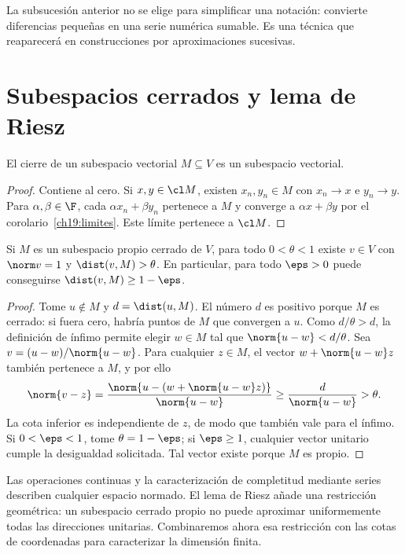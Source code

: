 La subsucesión anterior no se elige para simplificar una notación: convierte diferencias pequeñas en una serie numérica sumable. Es una técnica que reaparecerá en construcciones por aproximaciones sucesivas.

\section{Subespacios cerrados y lema de Riesz}

\begin{proposicion}\label{ch19:cierre-subespacio}
El cierre de un subespacio vectorial $M\subseteq V$ es un subespacio vectorial.
\end{proposicion}
\begin{proof}
Contiene al cero. Si $x,y\in\cl M$, existen $x_n,y_n\in M$ con $x_n\to x$ e $y_n\to y$. Para $\alpha,\beta\in\F$, cada $\alpha x_n+\beta y_n$ pertenece a $M$ y converge a $\alpha x+\beta y$ por el corolario~\ref{ch19:limites}. Este límite pertenece a $\cl M$.
\end{proof}

\begin{lema}[Riesz]\label{ch19:riesz}
Si $M$ es un subespacio propio cerrado de $V$, para todo $0<\theta<1$ existe $v\in V$ con $\norm v=1$ y $\dist(v,M)>\theta$. En particular, para todo $\eps>0$ puede conseguirse $\dist(v,M)\geq1-\eps$.
\end{lema}
\begin{proof}
Tome $u\notin M$ y $d=\dist(u,M)$. El número $d$ es positivo porque $M$ es cerrado: si fuera cero, habría puntos de $M$ que convergen a $u$. Como $d/\theta>d$, la definición de ínfimo permite elegir $w\in M$ tal que $\norm{u-w}<d/\theta$. Sea $v=(u-w)/\norm{u-w}$. Para cualquier $z\in M$, el vector $w+\norm{u-w}z$ también pertenece a $M$, y por ello
\[
 \norm{v-z}
 =\frac{\norm{u-(w+\norm{u-w}z)}}{\norm{u-w}}
 \geq\frac d{\norm{u-w}}>\theta.
\]
La cota inferior es independiente de $z$, de modo que también vale para el ínfimo. Si $0<\eps<1$, tome $\theta=1-\eps$; si $\eps\geq1$, cualquier vector unitario cumple la desigualdad solicitada. Tal vector existe porque $M$ es propio.
\end{proof}

Las operaciones continuas y la caracterización de completitud mediante series describen cualquier espacio normado. El lema de Riesz añade una restricción geométrica: un subespacio cerrado propio no puede aproximar uniformemente todas las direcciones unitarias. Combinaremos ahora esa restricción con las cotas de coordenadas para caracterizar la dimensión finita.

